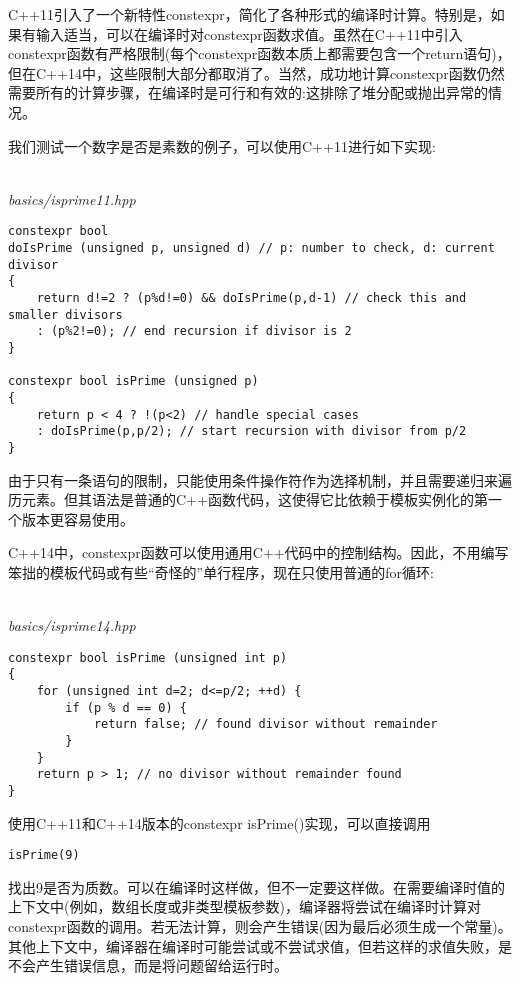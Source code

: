 C++11引入了一个新特性constexpr，简化了各种形式的编译时计算。特别是，如果有输入适当，可以在编译时对constexpr函数求值。虽然在C++11中引入constexpr函数有严格限制(每个constexpr函数本质上都需要包含一个return语句)，但在C++14中，这些限制大部分都取消了。当然，成功地计算constexpr函数仍然需要所有的计算步骤，在编译时是可行和有效的:这排除了堆分配或抛出异常的情况。

我们测试一个数字是否是素数的例子，可以使用C++11进行如下实现:

\hspace*{\fill} \\ %
\noindent
\textit{basics/isprime11.hpp}
\begin{lstlisting}[style=styleCXX]
constexpr bool
doIsPrime (unsigned p, unsigned d) // p: number to check, d: current divisor
{
	return d!=2 ? (p%d!=0) && doIsPrime(p,d-1) // check this and smaller divisors
	: (p%2!=0); // end recursion if divisor is 2
}

constexpr bool isPrime (unsigned p)
{
	return p < 4 ? !(p<2) // handle special cases
	: doIsPrime(p,p/2); // start recursion with divisor from p/2
}
\end{lstlisting}

由于只有一条语句的限制，只能使用条件操作符作为选择机制，并且需要递归来遍历元素。但其语法是普通的C++函数代码，这使得它比依赖于模板实例化的第一个版本更容易使用。

C++14中，constexpr函数可以使用通用C++代码中的控制结构。因此，不用编写笨拙的模板代码或有些“奇怪的”单行程序，现在只使用普通的for循环:

\hspace*{\fill} \\ %
\noindent
\textit{basics/isprime14.hpp}
\begin{lstlisting}[style=styleCXX]
constexpr bool isPrime (unsigned int p)
{
	for (unsigned int d=2; d<=p/2; ++d) {
		if (p % d == 0) {
			return false; // found divisor without remainder
		}
	}
	return p > 1; // no divisor without remainder found
}
\end{lstlisting}

使用C++11和C++14版本的constexpr isPrime()实现，可以直接调用

\begin{lstlisting}[style=styleCXX]
isPrime(9)
\end{lstlisting}

找出9是否为质数。可以在编译时这样做，但不一定要这样做。在需要编译时值的上下文中(例如，数组长度或非类型模板参数)，编译器将尝试在编译时计算对constexpr函数的调用。若无法计算，则会产生错误(因为最后必须生成一个常量)。其他上下文中，编译器在编译时可能尝试或不尝试求值，但若这样的求值失败，是不会产生错误信息，而是将问题留给运行时。

